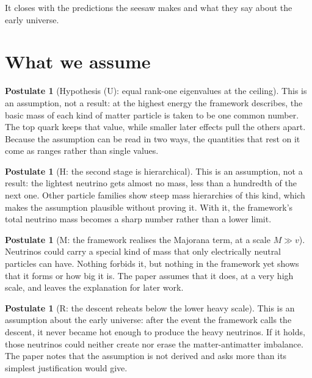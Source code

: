 \documentclass[11pt]{article}
\theoremstyle{definition}
\newtheorem{postulate}[theorem]{Postulate}
\theoremstyle{plain}
\begin{document}
It closes with the predictions the seesaw makes and what they say about the early universe.

\section{What we assume}

\begin{postulate}[Hypothesis (U): equal rank-one eigenvalues at the ceiling]\label{c:dark-matter.hyp-u-equal-rank-one-eigenvalues}
This is an assumption, not a result: at the highest energy the framework describes, the basic mass of each kind of matter particle is taken to be one common number. The top quark keeps that value, while smaller later effects pull the others apart. Because the assumption can be read in two ways, the quantities that rest on it come as ranges rather than single values.
\end{postulate}

\begin{postulate}[H: the second stage is hierarchical]\label{c:neutrino.h-second-stage-hierarchical}
This is an assumption, not a result: the lightest neutrino gets almost no mass, less than a hundredth of the next one. Other particle families show steep mass hierarchies of this kind, which makes the assumption plausible without proving it. With it, the framework's total neutrino mass becomes a sharp number rather than a lower limit.
\end{postulate}

\begin{postulate}[M: the framework realises the Majorana term, at a scale $M \gg v$]\label{c:neutrino.m-framework-realises-majorana-term-scale}
Neutrinos could carry a special kind of mass that only electrically neutral particles can have. Nothing forbids it, but nothing in the framework yet shows that it forms or how big it is. The paper assumes that it does, at a very high scale, and leaves the explanation for later work.
\end{postulate}

\begin{postulate}[R: the descent reheats below the lower heavy scale]\label{c:neutrino.r-descent-reheats-below-lower-heavy}
This is an assumption about the early universe: after the event the framework calls the descent, it never became hot enough to produce the heavy neutrinos. If it holds, those neutrinos could neither create nor erase the matter-antimatter imbalance. The paper notes that the assumption is not derived and asks more than its simplest justification would give.
\end{postulate}
\end{document}
